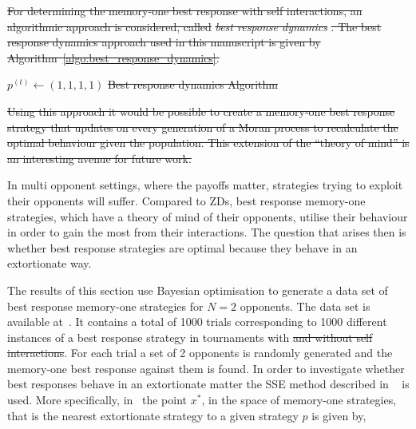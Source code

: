 \documentclass[fleqn,10pt]{wlscirep}
\providecommand{\DIFadd}[1]{{\protect\color{blue}\uwave{#1}}} %
\providecommand{\DIFdel}[1]{{\protect\color{red}\sout{#1}}}                      %
\providecommand{\DIFaddbegin}{} %
\providecommand{\DIFaddend}{} %
\providecommand{\DIFdelbegin}{} %
\providecommand{\DIFdelend}{} %
\begin{document}
\DIFdel{For determining the memory-one best response with self interactions, an
algorithmic approach is considered, called }\textit{\DIFdel{best response dynamics}}%
\DIFdel{. The
best response dynamics approach used in this manuscript is given by
Algorithm~\ref{algo:best_response_dynamics}.
}%

\DIFdel{$p^{(t)}\leftarrow (1, 1, 1, 1)$\;
       }%
{%
\DIFdel{Best response dynamics Algorithm}}

\DIFdel{Using this approach it would be possible to create a memory-one best response
strategy that updates on every generation of a Moran process to recalculate the
optimal behaviour given the population. This extension of the ``theory of mind''
is an interesting avenue for future work.
}%

\DIFdelend In multi opponent settings,
where the payoffs matter, strategies trying to exploit their opponents will
suffer.
Compared to ZDs, best response memory-one strategies, which have a
theory of mind of their opponents, utilise their behaviour in order to gain the
most from their interactions. The question that arises then is whether best
response strategies are optimal because they behave in an extortionate way.

The results of this section use Bayesian optimisation to generate a data set of best response
memory-one strategies for \(N=2\) opponents.
The data set is available at~\cite{glynatsi2019}. It contains a total of 1000 trials
corresponding to 1000 different instances of a best response strategy in
tournaments with \DIFdelbegin \DIFdel{and without self interactions}\DIFdelend \DIFaddbegin \DIFadd{\(N=2\)}\DIFaddend . For each trial a set of 2 opponents is
randomly generated and the memory-one best response against them is found.
In order to investigate whether best responses
behave in an extortionate matter the SSE method described in ~\cite{Knight2019} is used. More
specifically,
in~\cite{Knight2019} the point \(x^*\), in the space of memory-one strategies,
that is
the nearest extortionate strategy to a given strategy \(p\) is
given by,
\end{document}
